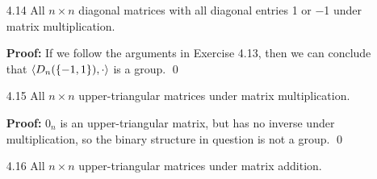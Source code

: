 \begin{enumerate}
		\textbf{Proof:} We want to prove that $\cyc{D_n(\R^*), \cdot}$ is a group.
      First we must show that $D_n(\R^*)$ is closed under $\cdot$. Let $X$ and 
      $Y$ be some members of $D_n(\R^*)$ such that
      $X$ = diag[$x_1$ $x_2$ $\cdots$ $x_n$] and
      $Y$ = diag[$y_1$ $y_2$ $\cdots$ $y_n$]. Then $X \cdot Y$ =
      diag[$(x_1 \cdot y_1)$ $(x_2 \cdot y_2)$ $\cdots$ $(x_n \cdot y_n)$]. 
      Since $x_i$ and $y_i$ are nonzero, we must have that $x_iy_i \neq 0$, so 
      that $X \cdot Y \in D_n(\R^*)$; i.e., $D_n(\R^*)$ is closed under 
      multiplication. So now we must now show that the group axioms hold for
      $\cyc{D_n(\R^*), \cdot}$.
		\begin{enumerate}
			\item[$\mathscr{G}_1$:] See Exercise 4.11.
											
			\item[$\mathscr{G}_2$:] Since $I_n \in \cyc{D_n(\R^*)}$, it is the
											identity for $\cyc{D_n(\R^*), \cdot}$.
			\item[$\mathscr{G}_3$:] Let diag[$b_1$ $b_2$ $\cdots$ $b_n$]
											$\in D_n(\R*)$. Then we have that
											diag[$b_1$ $b_2$ $\cdots$ $b_n$] $\cdot$
											diag[$1/b_1$ $1/b_2$ $\cdots$ $1/b_n$] =
											diag[$1/b_1$ $1/b_2$ $\cdots$ $1/b_n$] $\cdot$
											diag[$b_1$ $b_2$ $\cdots$ $b_n$] = $I_n$,
											so that every element of $D_n(\R)$ has an
											inverse under multiplication. We were able to
											take the reciprocals of the real numbers $b_1$,
											$b_2$, $\ldots$, $b_n$ because they were all
											nonzero numbers.
		\end{enumerate}
		
		We have shown in the above that $\cyc{D_n(\R^*), \cdot}$ is a group. \qed
   \item[4.14] All $n \times n$ diagonal matrices with all diagonal entries 1 or
               $-$1 under matrix multiplication.
	
		\textbf{Proof:} If we follow the arguments in Exercise 4.13, then we can
      conclude that $\langle D_n(\{-1, 1\}), \cdot \rangle$ is a group. \qed
   \item[4.15] All $n \times n$ upper-triangular matrices under matrix 
               multiplication.
	
		\textbf{Proof:} $0_n$ is an upper-triangular matrix, but has no inverse
      under multiplication, so the binary structure in question is not a group.
      \qed
   \item[4.16] All $n \times n$ upper-triangular matrices under matrix addition.
	

\end{enumerate}
